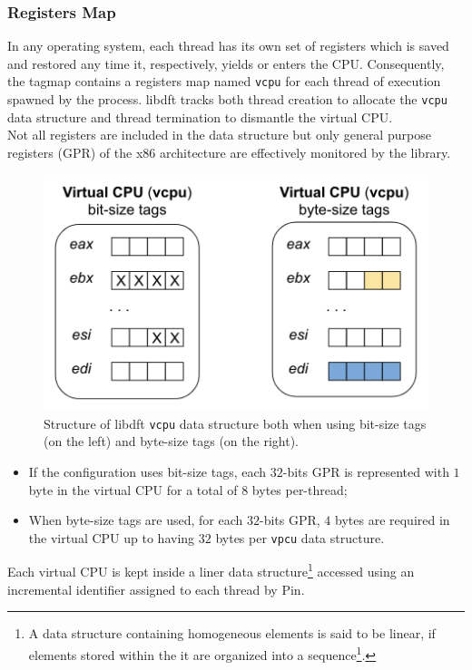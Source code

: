 \documentclass[LaM,binding=0.6cm]{sapthesis}
\begin{document}
\subsubsection{Registers Map}
In any operating system, each thread has its own set of registers which is saved and restored any time it, respectively, yields or enters the CPU. Consequently, the tagmap contains a registers map named \texttt{vcpu} for each thread of execution spawned by the process. libdft tracks both thread creation to allocate the \texttt{vcpu} data structure and thread termination to dismantle the virtual CPU.\\
Not all registers are included in the data structure but only general purpose registers (GPR) of the x$86$ architecture are effectively monitored by the library. \\

\begin{figure}[h!]
\centering
\includegraphics[scale=.6]{images/techn12}
\caption{Structure of libdft \texttt{vcpu} data structure both when using bit-size tags (on the left) and byte-size tags (on the right).}
\end{figure}

\begin{itemize}
\item If the configuration uses bit-size tags, each $32$-bits GPR is represented with $1$ byte in the virtual CPU for a total of $8$ bytes per-thread;
\item When byte-size tags are used, for each $32$-bits GPR, $4$ bytes are required in the virtual CPU up to having $32$ bytes per \texttt{vpcu} data structure.
\end{itemize}
Each virtual CPU is kept inside a liner data structure\footnote{A data structure containing homogeneous elements is said to be linear, if elements stored within the it are organized into a sequence\footnote{li1998linear}.} accessed using an incremental identifier assigned to each thread by Pin.
\end{document}
